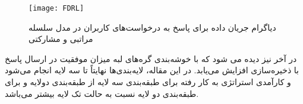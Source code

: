 \begin{figure}[ht]
	\centerline{\texttt{[image: FDRL]}}
	\caption{دیاگرام جریان داده برای پاسخ به درخواست‌های کاربران در مدل سلسله مراتبی و مشارکتی}
	\label{fig:fdrl}
\end{figure}

در آخر نیز دیده می شود که با خوشه‌بندی گره‌های لبه میزان موفقیت در ارسال پاسخ با ذخیره‌سازی افزایش می‌یابد. در این مقاله، لایه‌بندی‌ها نهایتاً تا سه لایه انجام می‌شود و کارآمدی استراتژی به کار رفته برای طبقه‌بندی سه لایه از طبقه‌بندی دولایه و برای طبقه‌بندی دو لایه نسبت به حالت تک لایه بیشتر می‌باشد.


